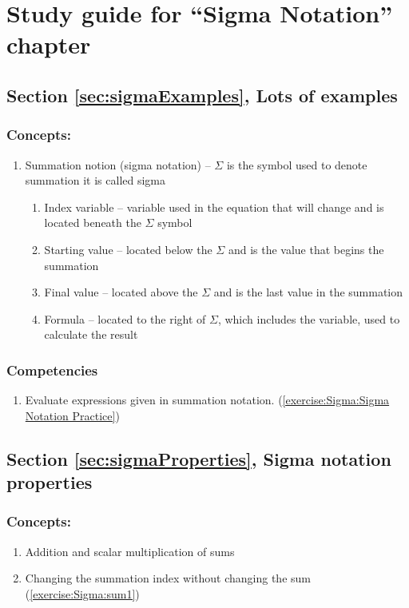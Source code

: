 \section{Study guide  for ``Sigma Notation''  chapter}
\label{sec:SigmaNotation:StudyGuide} 
\subsection*{Section \ref{sec:sigmaExamples}, Lots of examples}
\subsubsection*{Concepts:}
\begin{enumerate}
\item 
Summation notion (sigma notation) -- $\Sigma$ is the symbol used to denote summation it is called sigma
\begin{enumerate}
\item
Index variable -- variable used in the equation that will change and is located beneath the $\Sigma$ symbol
\item
Starting value -- located below the $\Sigma$ and is the value that begins the summation
\item
Final value -- located above the $\Sigma$ and is the last value in the summation
\item
Formula -- located to the right of $\Sigma$, which includes the variable, used to calculate the result
\end{enumerate}
\end{enumerate}

\subsubsection*{Competencies}
\begin{enumerate}
\item
Evaluate expressions given in summation notation. (\ref{exercise:Sigma:Sigma Notation Practice})
\end{enumerate}


\subsection*{Section \ref{sec:sigmaProperties}, Sigma notation properties}
\subsubsection*{Concepts:}
\begin{enumerate}
\item 
Addition and scalar multiplication of sums
\item
Changing the summation index without changing the sum (\ref{exercise:Sigma:sum1})
\end{enumerate}

